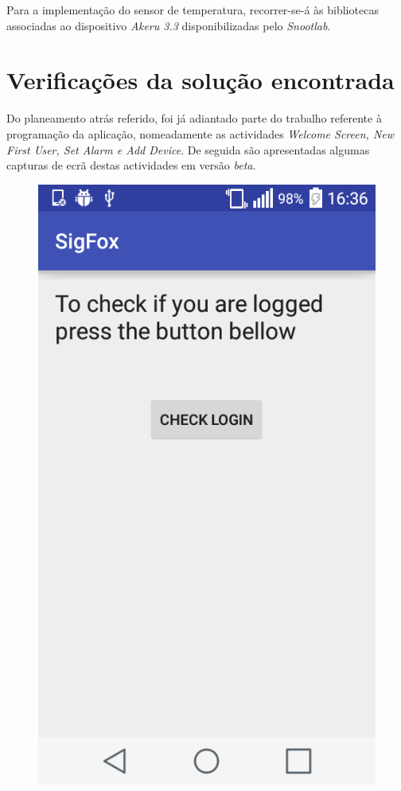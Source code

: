 \documentclass[a4paper]{article}
\begin{document}
Para a implementação do sensor de temperatura, recorrer-se-á às bibliotecas associadas ao dispositivo \textit{Akeru 3.3} disponibilizadas pelo \textit{Snootlab}.

\section{Verificações da solução encontrada}

Do planeamento atrás referido, foi já adiantado parte do trabalho referente à programação da aplicação, nomeadamente as actividades \textit{Welcome Screen, New First User, Set Alarm e Add Device}. De seguida são apresentadas algumas capturas de ecrã destas actividades em versão \textit{beta}.

\begin{figure}[H]
  \includegraphics[width=\linewidth]{welcome.png}

\end{figure}
\end{document}
